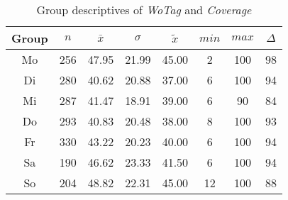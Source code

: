 \begin{table}[ht!]
	\tiny
	\centering
    \begin{tabular}{c|c|c|c|c|c|c|c}
        \toprule
        Group & $n$ & $\bar{x}$ & $\sigma$ & $\tilde{x}$ & $min$ & $max$ & $\Delta$ \\ 
        \midrule
        Mo & 256 & 47.95 & 21.99 & 45.00 & 2  & 100 & 98 \\ 
        Di & 280 & 40.62 & 20.88 & 37.00 & 6  & 100 & 94 \\ 
        Mi & 287 & 41.47 & 18.91 & 39.00 & 6  & 90  & 84 \\ 
        Do & 293 & 40.83 & 20.48 & 38.00 & 8  & 100 & 93 \\ 
        Fr & 330 & 43.22 & 20.23 & 40.00 & 6  & 100 & 94 \\ 
        Sa & 190 & 46.62 & 23.33 & 41.50 & 6  & 100 & 94 \\ 
        So & 204 & 48.82 & 22.31 & 45.00 & 12 & 100 & 88 \\ 
        \bottomrule
      \end{tabular}
	\caption{Group descriptives of \textit{WoTag} and \textit{Coverage}}
	\label{tbl:descriptives_baysis_matched_WoTag_Cov}
\end{table}

